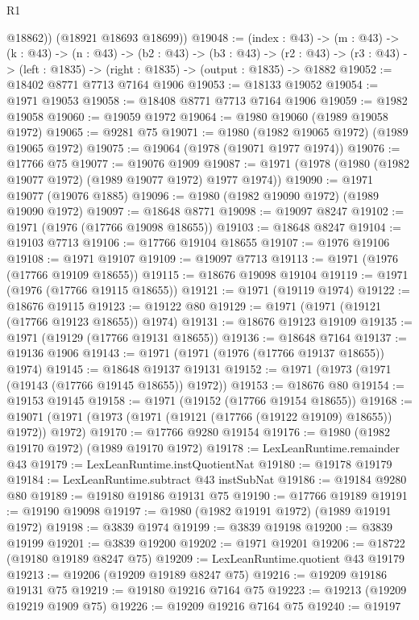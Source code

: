\begin{lexlean}{R1}
\begin{coremodule}
          @18862))
      (@18921 @18693 @18699))
@19048 := (index : @43) ->
  (m : @43) ->
  (k : @43) ->
  (n : @43) ->
  (b2 : @43) ->
  (b3 : @43) ->
  (r2 : @43) -> (r3 : @43) -> (left : @1835) -> (right : @1835) -> (output : @1835) -> @1882
@19052 := @18402 @8771 @7713 @7164 @1906
@19053 := @18133 @19052
@19054 := @1971 @19053
@19058 := @18408 @8771 @7713 @7164 @1906
@19059 := @1982 @19058
@19060 := @19059 @1972
@19064 := @1980 @19060 (@1989 @19058 @1972)
@19065 := @9281 @75
@19071 := @1980 (@1982 @19065 @1972) (@1989 @19065 @1972)
@19075 := @19064 (@1978 (@19071 @1977 @1974))
@19076 := @17766 @75
@19077 := @19076 @1909
@19087 := @1971 (@1978 (@1980 (@1982 @19077 @1972) (@1989 @19077 @1972) @1977 @1974))
@19090 := @1971 @19077 (@19076 @1885)
@19096 := @1980 (@1982 @19090 @1972) (@1989 @19090 @1972)
@19097 := @18648 @8771
@19098 := @19097 @8247
@19102 := @1971 (@1976 (@17766 @19098 @18655))
@19103 := @18648 @8247
@19104 := @19103 @7713
@19106 := @17766 @19104 @18655
@19107 := @1976 @19106
@19108 := @1971 @19107
@19109 := @19097 @7713
@19113 := @1971 (@1976 (@17766 @19109 @18655))
@19115 := @18676 @19098 @19104
@19119 := @1971 (@1976 (@17766 @19115 @18655))
@19121 := @1971 (@19119 @1974)
@19122 := @18676 @19115
@19123 := @19122 @80
@19129 := @1971 (@1971 (@19121 (@17766 @19123 @18655)) @1974)
@19131 := @18676 @19123 @19109
@19135 := @1971 (@19129 (@17766 @19131 @18655))
@19136 := @18648 @7164
@19137 := @19136 @1906
@19143 := @1971 (@1971 (@1976 (@17766 @19137 @18655)) @1974)
@19145 := @18648 @19137 @19131
@19152 := @1971 (@1973 (@1971 (@19143 (@17766 @19145 @18655)) @1972))
@19153 := @18676 @80
@19154 := @19153 @19145
@19158 := @1971 (@19152 (@17766 @19154 @18655))
@19168 := @19071 (@1971 (@1973 (@1971 (@19121 (@17766 (@19122 @19109) @18655)) @1972)) @1972)
@19170 := @17766 @9280 @19154
@19176 := @1980 (@1982 @19170 @1972) (@1989 @19170 @1972)
@19178 := LexLeanRuntime.remainder @43
@19179 := LexLeanRuntime.instQuotientNat
@19180 := @19178 @19179
@19184 := LexLeanRuntime.subtract @43 instSubNat
@19186 := @19184 @9280 @80
@19189 := @19180 @19186 @19131 @75
@19190 := @17766 @19189
@19191 := @19190 @19098
@19197 := @1980 (@1982 @19191 @1972) (@1989 @19191 @1972)
@19198 := @3839 @1974
@19199 := @3839 @19198
@19200 := @3839 @19199
@19201 := @3839 @19200
@19202 := @1971 @19201
@19206 := @18722 (@19180 @19189 @8247 @75)
@19209 := LexLeanRuntime.quotient @43 @19179
@19213 := @19206 (@19209 @19189 @8247 @75)
@19216 := @19209 @19186 @19131 @75
@19219 := @19180 @19216 @7164 @75
@19223 := @19213 (@19209 @19219 @1909 @75)
@19226 := @19209 @19216 @7164 @75
@19240 := @19197

\end{coremodule}
\end{lexlean}
